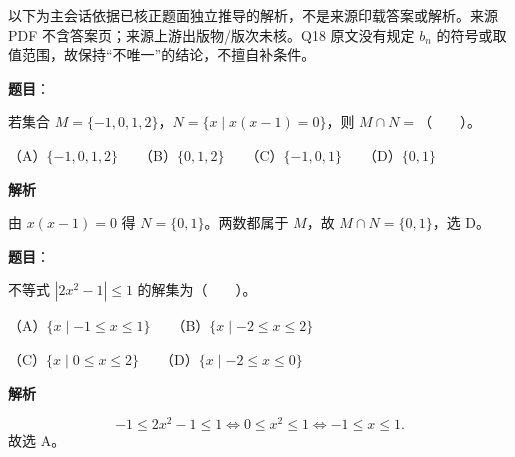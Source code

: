 

\begin{gktip}
以下为主会话依据已核正题面独立推导的解析，不是来源印载答案或解析。来源 PDF 不含答案页；来源上游出版物/版次未核。Q18 原文没有规定 $b_n$ 的符号或取值范围，故保持“不唯一”的结论，不擅自补条件。
\end{gktip}

\begin{answer}

\textbf{题目}：

若集合 $M=\{-1,0,1,2\}$，$N=\{x\mid x(x-1)=0\}$，则 $M\cap N=$\mbox{（　　）}。

（A）$\{-1,0,1,2\}$　　（B）$\{0,1,2\}$　　（C）$\{-1,0,1\}$　　（D）$\{0,1\}$

\textbf{解析}

由 $x(x-1)=0$ 得 $N=\{0,1\}$。两数都属于 $M$，故 $M\cap N=\{0,1\}$，选 D。


\end{answer}
\begin{answer}

\textbf{题目}：

不等式 $|2x^2-1|\leq 1$ 的解集为\mbox{（　　）}。

（A）$\{x\mid -1\leq x\leq 1\}$　　（B）$\{x\mid -2\leq x\leq 2\}$

（C）$\{x\mid 0\leq x\leq 2\}$　　（D）$\{x\mid -2\leq x\leq 0\}$

\textbf{解析}

\nopagebreak[4]
\[
-1\le 2x^2-1\le1
\iff 0\le x^2\le1
\iff -1\le x\le1.
\]
故选 A。


\end{answer}

